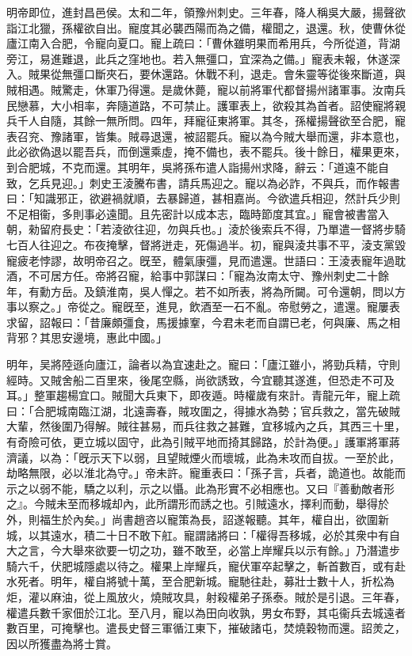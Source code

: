 \begin{pinyinscope}
明帝即位，進封昌邑侯。太和二年，領豫州刺史。三年春，降人稱吳大嚴，揚聲欲詣江北獵，孫權欲自出。寵度其必襲西陽而為之備，權聞之，退還。秋，使曹休從廬江南入合肥，令寵向夏口。寵上疏曰：「曹休雖明果而希用兵，今所從道，背湖旁江，易進難退，此兵之窪地也。若入無彊口，宜深為之備。」寵表未報，休遂深入。賊果從無彊口斷夾石，要休還路。休戰不利，退走。會朱靈等從後來斷道，與賊相遇。賊驚走，休軍乃得還。是歲休薨，寵以前將軍代都督揚州諸軍事。汝南兵民戀慕，大小相率，奔隨道路，不可禁止。護軍表上，欲殺其為首者。詔使寵將親兵千人自隨，其餘一無所問。四年，拜寵征東將軍。其冬，孫權揚聲欲至合肥，寵表召兖、豫諸軍，皆集。賊尋退還，被詔罷兵。寵以為今賊大舉而還，非本意也，此必欲偽退以罷吾兵，而倒還乘虛，掩不備也，表不罷兵。後十餘日，權果更來，到合肥城，不克而還。其明年，吳將孫布遣人詣揚州求降，辭云：「道遠不能自致，乞兵見迎。」刺史王淩騰布書，請兵馬迎之。寵以為必詐，不與兵，而作報書曰：「知識邪正，欲避禍就順，去暴歸道，甚相嘉尚。今欲遣兵相迎，然計兵少則不足相衞，多則事必遠聞。且先密計以成本志，臨時節度其宜。」寵會被書當入朝，勑留府長史：「若淩欲往迎，勿與兵也。」淩於後索兵不得，乃單遣一督將步騎七百人往迎之。布夜掩擊，督將迸走，死傷過半。初，寵與淩共事不平，淩支黨毀寵疲老悖謬，故明帝召之。旣至，體氣康彊，見而遣還。世語曰：王淩表寵年過耽酒，不可居方任。帝將召寵，給事中郭謀曰：「寵為汝南太守、豫州刺史二十餘年，有勳方岳。及鎮淮南，吳人憚之。若不如所表，將為所闚。可令還朝，問以方事以察之。」帝從之。寵旣至，進見，飲酒至一石不亂。帝慰勞之，遣還。寵屢表求留，詔報曰：「昔廉頗彊食，馬援據鞌，今君未老而自謂已老，何與廉、馬之相背邪？其思安邊境，惠此中國。」

明年，吴將陸遜向廬江，論者以為宜速赴之。寵曰：「廬江雖小，將勁兵精，守則經時。又賊舍船二百里來，後尾空縣，尚欲誘致，今宜聽其遂進，但恐走不可及耳。」整軍趨楊宜口。賊聞大兵東下，即夜遁。時權歲有來計。青龍元年，寵上疏曰：「合肥城南臨江湖，北遠壽春，賊攻圍之，得據水為勢；官兵救之，當先破賊大輩，然後圍乃得解。賊往甚易，而兵往救之甚難，宜移城內之兵，其西三十里，有奇險可依，更立城以固守，此為引賊平地而掎其歸路，於計為便。」護軍將軍蔣濟議，以為：「旣示天下以弱，且望賊煙火而壞城，此為未攻而自拔。一至於此，劫略無限，必以淮北為守。」帝未許。寵重表曰：「孫子言，兵者，詭道也。故能而示之以弱不能，驕之以利，示之以懾。此為形實不必相應也。又曰『善動敵者形之』。今賊未至而移城却內，此所謂形而誘之也。引賊遠水，擇利而動，舉得於外，則福生於內矣。」尚書趙咨以寵策為長，詔遂報聽。其年，權自出，欲圍新城，以其遠水，積二十日不敢下舡。寵謂諸將曰：「權得吾移城，必於其衆中有自大之言，今大舉來欲要一切之功，雖不敢至，必當上岸耀兵以示有餘。」乃潛遣步騎六千，伏肥城隱處以待之。權果上岸耀兵，寵伏軍卒起擊之，斬首數百，或有赴水死者。明年，權自將號十萬，至合肥新城。寵馳往赴，募壯士數十人，折松為炬，灌以麻油，從上風放火，燒賊攻具，射殺權弟子孫泰。賊於是引退。三年春，權遣兵數千家佃於江北。至八月，寵以為田向收孰，男女布野，其屯衞兵去城遠者數百里，可掩擊也。遣長史督三軍循江東下，摧破諸屯，焚燒穀物而還。詔羙之，因以所獲盡為將士賞。


\end{pinyinscope}
